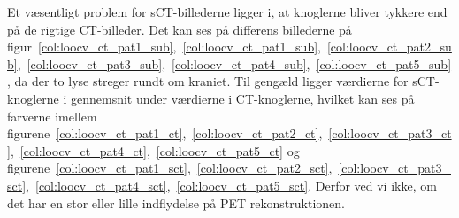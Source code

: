 Et væsentligt problem for sCT-billederne ligger i, at knoglerne bliver tykkere end på de rigtige CT-billeder. Det kan ses på differens billederne på figur~\ref{col:loocv_ct_pat1_sub},~\ref{col:loocv_ct_pat1_sub},~\ref{col:loocv_ct_pat2_sub},~\ref{col:loocv_ct_pat3_sub},~\ref{col:loocv_ct_pat4_sub},~\ref{col:loocv_ct_pat5_sub}, da der to lyse streger rundt om kraniet. Til gengæld ligger værdierne for sCT-knoglerne i gennemsnit under værdierne i CT-knoglerne, hvilket kan ses på farverne imellem figurene~\ref{col:loocv_ct_pat1_ct},~\ref{col:loocv_ct_pat2_ct},~\ref{col:loocv_ct_pat3_ct},~\ref{col:loocv_ct_pat4_ct},~\ref{col:loocv_ct_pat5_ct} og figurene~\ref{col:loocv_ct_pat1_sct},~\ref{col:loocv_ct_pat2_sct},~\ref{col:loocv_ct_pat3_sct},~\ref{col:loocv_ct_pat4_sct},~\ref{col:loocv_ct_pat5_sct}. Derfor ved vi ikke, om det har en stor eller lille indflydelse på PET rekonstruktionen.

